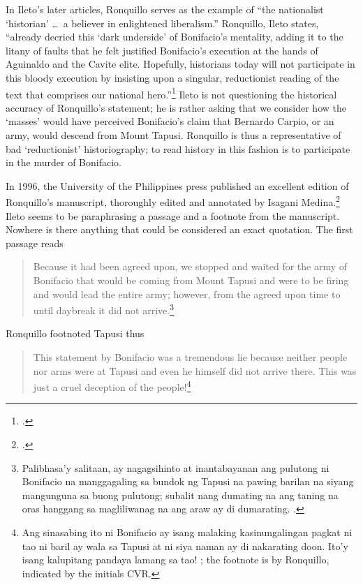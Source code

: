 In Ileto's later articles, Ronquillo serves as the example of \enquote{the nationalist \enquote{historian} \ldots\ a believer in enlightened liberalism.} Ronquillo, Ileto states, \enquote{already decried this \enquote{dark underside} of Bonifacio's mentality, adding it to the litany of faults that he felt justified Bonifacio’s execution at the hands of Aguinaldo and the Cavite elite. Hopefully, historians today will not participate in this bloody execution by insisting upon a singular, reductionist reading of the text that comprises our national hero.}\footcite[12]{Ileto1982a} Ileto is not questioning the historical accuracy of Ronquillo's statement; he is rather asking that we consider how the \enquote*{masses} would have perceived Bonifacio's claim that Bernardo Carpio, or an army, would descend from Mount Tapusi. Ronquillo is thus a representative of bad \enquote*{reductionist} historiography; to read history in this fashion is to participate in the murder of Bonifacio.

In 1996, the University of the Philippines press published an excellent edition of Ronquillo's manuscript, thoroughly edited and annotated by Isagani Medina.\footcite{Ronquillo1996} Ileto seems to be paraphrasing a passage and a footnote from the manuscript. Nowhere is there anything that could be considered an exact quotation. The first passage reads

\begin{quote}
Because it had been agreed upon, we stopped and waited for the army of Bonifacio that would be coming from Mount Tapusi and were to be firing and would lead the entire army; however, from the agreed upon time to until daybreak it did not arrive.\footnote{Palibhasa'y salitaan, ay nagagsihinto at inantabayanan ang pulutong ni Bonifacio na manggagaling sa bundok ng Tapusi na pawing barilan na siyang mangunguna sa buong pulutong; subalit nang dumating na ang taning na oras hanggang sa magliliwanag na ang araw ay di dumarating. \parencite[216]{Ronquillo1996}.}
\end{quote}

Ronquillo footnoted Tapusi thus

\begin{quote}
This statement by Bonifacio was a tremendous lie because neither people nor arms were at Tapusi and even he himself did not arrive there. This was just a cruel deception of the people!\footnote{Ang sinasabing ito ni Bonifacio ay isang malaking kasinungalingan pagkat ni tao ni baril ay wala sa Tapusi at ni siya naman ay di nakarating doon. Ito'y isang kalupitang pandaya lamang sa tao! \cite[684, fn. 3]{Ronquillo1996}; the footnote is by Ronquillo, indicated by the initials CVR.}
\end{quote}

